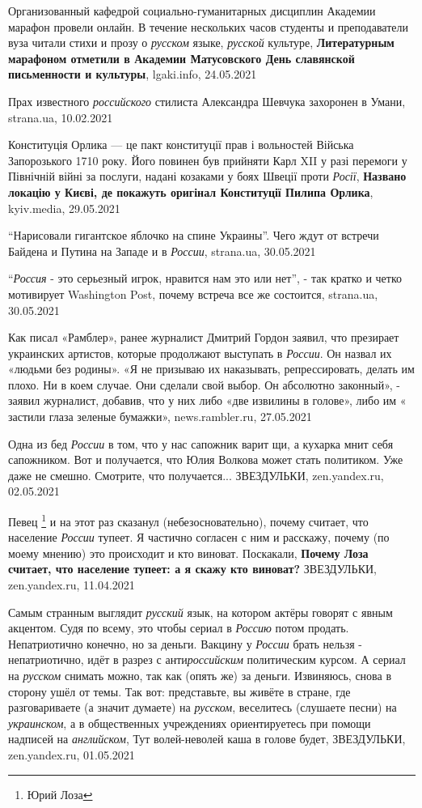Организованный кафедрой социально-гуманитарных дисциплин Академии марафон
провели онлайн. В течение нескольких часов студенты и преподаватели вуза читали
стихи и прозу о \emph{русском} языке, \emph{русской} культуре,
\textbf{Литературным марафоном отметили в Академии Матусовского День славянской
письменности и культуры}, lgaki.info, 24.05.2021

Прах известного \emph{российского} стилиста Александра Шевчука захоронен в
Умани, strana.ua, 10.02.2021

Конституція Орлика — це пакт конституції прав і вольностей Війська Запорозького
1710 року. Його повинен був прийняти Карл XII у разі перемоги у Північній війні
за послуги, надані козаками у боях Швеції проти \emph{Росії}, \textbf{Названо
локацію у Києві, де покажуть оригінал Конституції Пилипа Орлика}, kyiv.media,
29.05.2021

\enquote{Нарисовали гигантское яблочко на спине Украины}. Чего ждут от встречи
Байдена и Путина на Западе и в \emph{России}, strana.ua, 30.05.2021

\enquote{\emph{Россия} - это серьезный игрок, нравится нам это или нет}, - так
кратко и четко мотивирует Washington Post, почему встреча все же состоится,
strana.ua, 30.05.2021

Как писал «Рамблер», ранее журналист Дмитрий Гордон заявил, что презирает
украинских артистов, которые продолжают выступать в \emph{России}. Он назвал их
«людьми без родины».  «Я не призываю их наказывать, репрессировать, делать им
плохо. Ни в коем случае. Они сделали свой выбор. Он абсолютно законный», -
заявил журналист, добавив, что у них либо «две извилины в голове», либо им «
застили глаза зеленые бумажки», news.rambler.ru, 27.05.2021

Одна из бед \emph{России} в том, что у нас сапожник варит щи, а кухарка мнит
себя сапожником. Вот и получается, что Юлия Волкова может стать политиком. Уже
даже не смешно. Смотрите, что получается... ЗВЕЗДУЛЬКИ, zen.yandex.ru,
02.05.2021

Певец \footnote{Юрий Лоза} и на этот раз сказанул (небезосновательно), почему
считает, что население \emph{России} тупеет. Я частично согласен с ним и
расскажу, почему (по моему мнению) это происходит и кто виноват. Поскакали,
\textbf{Почему Лоза считает, что население тупеет: а я скажу кто виноват?}
ЗВЕЗДУЛЬКИ, zen.yandex.ru, 11.04.2021

Самым странным выглядит \emph{русский} язык, на котором актёры говорят с явным
акцентом. Судя по всему, это чтобы сериал в \emph{Россию} потом продать.
Непатриотично конечно, но за деньги. Вакцину у \emph{России} брать нельзя -
непатриотично, идёт в разрез с анти\emph{российским} политическим курсом. А сериал на
\emph{русском} снимать можно, так как (опять же) за деньги.  Извиняюсь, снова в
сторону ушёл от темы. Так вот: представьте, вы живёте в стране, где
разговариваете (а значит думаете) на \emph{русском}, веселитесь (слушаете
песни) на \emph{украинском}, а в общественных учреждениях ориентируетесь при
помощи надписей на \emph{английском}, Тут волей-неволей каша в голове будет,
ЗВЕЗДУЛЬКИ, zen.yandex.ru, 01.05.2021

